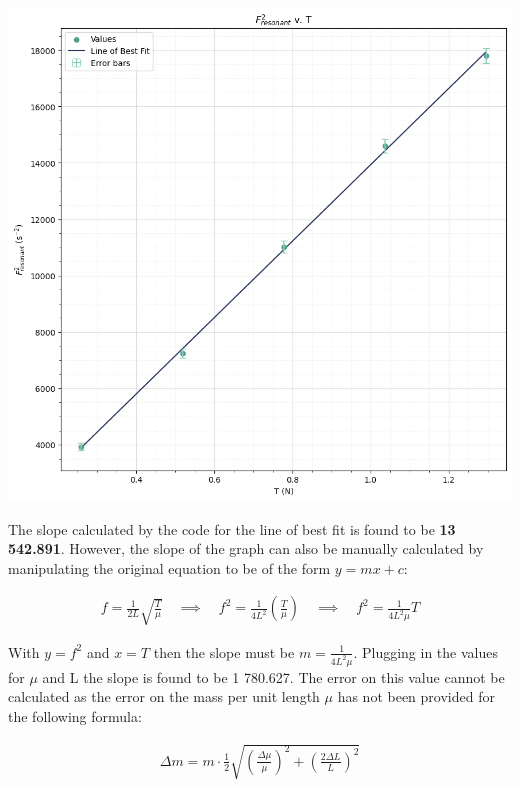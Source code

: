 \documentclass[12pt]{article}
\begin{document}
\hfill
\begin{minipage}{.5\textwidth}
    \captionsetup{hypcap=false}
    \includegraphics[width=\linewidth]{waves tension graph.png}
    \label{fig:tensiongraph}
\end{minipage}

The slope calculated by the code for the line of best fit is found to be \textbf{13 542.891}.
However, the slope of the graph can also be manually calculated by manipulating the original equation to be of the form $y=mx+c$:

\vspace{-1.5ex}
\begin{gather*}
    f = \frac{1}{2L} \sqrt{\frac{T}{\mu}} \quad \implies \quad f^2 = \frac{1}{4L^2} \left( \frac{T}{\mu} \right) \quad \implies \quad f^2 = \frac{1}{4L^2 \mu} T
\end{gather*}

With $y = f^2$ and $x = T$ then the slope must be $m = \frac{1}{4L^2 \mu}$. Plugging in the values for $\mu$ and L the slope is found to be 1 780.627. The error on this value cannot be calculated
as the error on the mass per unit length $\mu$ has not been provided for the following formula:

\vspace{-1.5ex}
\begin{gather*}
    \Delta m = m \cdot \frac{1}{2} \sqrt{\left( \frac{\Delta \mu}{\mu} \right)^2 + \left( \frac{2 \Delta L}{L} \right)^2}
\end{gather*}
\end{document}
